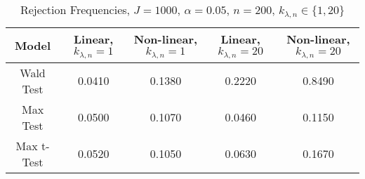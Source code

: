  \begin{table}[H] 
 \small 
 \centering 
\begin{tabular}{|c|c|c|c|c|} 
 \hline 
Model & Linear, $k_{\lambda,n}=1$ & Non-linear, $k_{\lambda,n}=1$ & Linear, $k_{\lambda,n}=20$ & Non-linear, $k_{\lambda,n}=20$   \\ 
 \hline 
 Wald Test &  0.0410 &  0.1380 &  0.2220 &  0.8490 \\ 
 Max Test &  0.0500 &  0.1070 &  0.0460 &  0.1150 \\ 
 Max t-Test &  0.0520 &  0.1050 &  0.0630 &  0.1670 \\ 
 \hline 
\end{tabular}
\caption{Rejection Frequencies, $J=1000$, $\alpha = 0.05$, $n=200$, $k_{\lambda,n}\in \{1,20\}$}
 \end{table}
